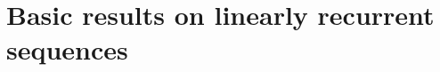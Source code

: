 \documentclass[12pt]{article}
\begin{document}



\section{Basic results on linearly recurrent sequences}
\end{document}
